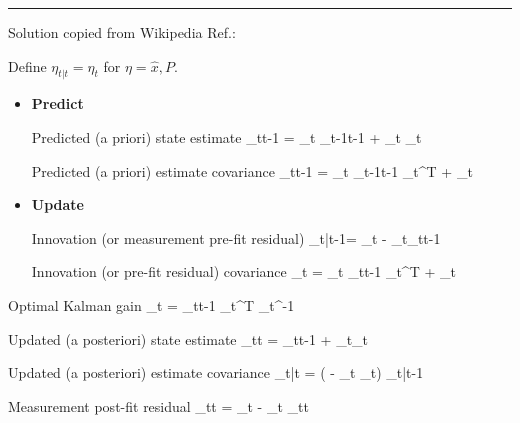 \hrule \noindent
Solution copied from Wikipedia Ref.\cite{wiki-kalman}:


Define $\eta_{t|t}=\eta_t$ for 
$\eta=\hat{x}, P$.

\begin{itemize}
\item{\bf Predict}

Predicted (a priori) state estimate
\beq
{}_{t\mid t-1} =
 _t
_{t-1\mid t-1}
 + _t _{t}
\eeq

Predicted (a priori) estimate covariance
\beq
{}_{t\mid t-1} =
 _t 
_{t-1\mid t-1}
 _t^\textsf{T} +
 _t
\eeq

\item{\bf Update}

Innovation (or measurement 
pre-fit residual)
\beq
{}_{t|t-1}= 
_t - 
_t_{t\mid t-1}
\eeq

Innovation (or pre-fit residual)
 covariance
\beq
{}_t = _t 
_{t\mid t-1} 
_t^\textsf{T} +
 _t
\eeq

\end{itemize}


Optimal Kalman gain
\beq
{}_t = _{t\mid t-1}
_t^\textsf{T}
 _t^{-1}
\eeq


Updated (a posteriori) state estimate
\beq
{}_{t\mid t} =
 _{t\mid t-1} +
 _t_t
\eeq

Updated (a posteriori) estimate covariance
\beq
{}_{t|t} = \left( -
 _t _t\right) 
_{t|t-1} 
\eeq

Measurement post-fit residual
\beq
{}_{t\mid t} =
 _t - _t
_{t\mid t}
\eeq